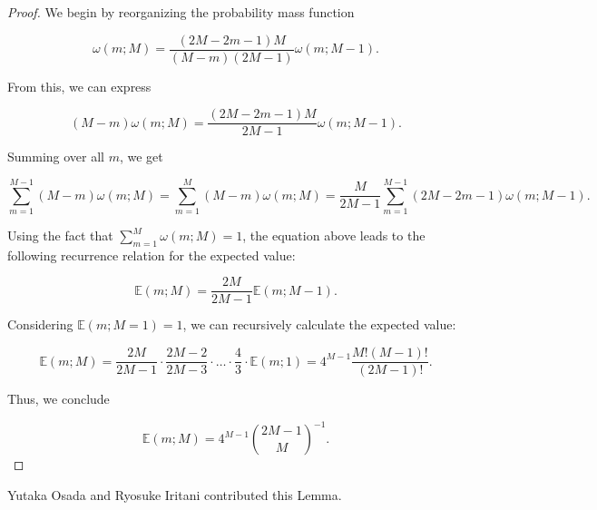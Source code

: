 \documentclass[11pt, class=article, crop=false]{standalone}
\theoremstyle{definition}
\begin{document}
\begin{proof}
We begin by reorganizing the probability mass function

\begin{equation}
    \omega(m; M) = \frac{(2M - 2m - 1) M}{(M - m)(2M - 1)} \omega(m; M - 1).
\end{equation}

From this, we can express

\begin{equation}
    (M - m) \omega(m; M) = \frac{(2M - 2m - 1) M}{2M - 1} \omega(m; M - 1).
\end{equation}

Summing over all $m$, we get

\begin{equation}
    \sum_{m = 1}^{M - 1} (M - m) \omega(m; M)
    = \sum_{m = 1}^{M} (M - m) \omega(m; M)
    = \frac{M}{2M - 1} \sum_{m = 1}^{M - 1} (2M - 2m - 1) \omega(m; M - 1).
\end{equation}

Using the fact that $\sum_{m = 1}^{M} \omega(m; M) = 1$, the equation above leads to the following recurrence relation for the expected value:

\begin{equation}
    \mathbb{E}(m; M) = \frac{2M}{2M - 1} \mathbb{E}(m; M - 1).
\end{equation}

Considering $\mathbb{E}(m; M = 1) = 1$, we can recursively calculate the expected value:

\begin{equation}
    \mathbb{E}(m; M) = \frac{2M}{2M - 1} \cdot \frac{2M - 2}{2M - 3} \cdot \ldots \cdot \frac{4}{3} \cdot \mathbb{E}(m; 1) = 4^{M - 1} \frac{M!(M - 1)!}{(2M - 1)!}.
\end{equation}

Thus, we conclude

\begin{equation}
    \mathbb{E}(m; M) = 4^{M - 1} \binom{2M - 1}{M}^{-1}.
\end{equation}
\end{proof}

Yutaka Osada and Ryosuke Iritani contributed this Lemma.
\end{document}
